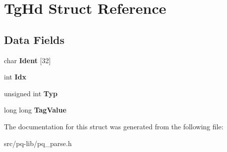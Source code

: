 \hypertarget{struct_tg_hd}{}\section{Tg\+Hd Struct Reference}
\label{struct_tg_hd}
\subsection*{Data Fields}
\begin{DoxyCompactItemize}
\item 
\hypertarget{struct_tg_hd_ab0c0523d5cf6f8f7e829c7cb9a71e26c}{}char {\bfseries Ident} \mbox{[}32\mbox{]}\label{struct_tg_hd_ab0c0523d5cf6f8f7e829c7cb9a71e26c}

\item 
\hypertarget{struct_tg_hd_a5c3a15f69644a6f40e92d622cd896c43}{}int {\bfseries Idx}\label{struct_tg_hd_a5c3a15f69644a6f40e92d622cd896c43}

\item 
\hypertarget{struct_tg_hd_ac9f557303814069bfdb07e797c01b274}{}unsigned int {\bfseries Typ}\label{struct_tg_hd_ac9f557303814069bfdb07e797c01b274}

\item 
\hypertarget{struct_tg_hd_abf24048c0f1fba937de64b82981ffe4c}{}long long {\bfseries Tag\+Value}\label{struct_tg_hd_abf24048c0f1fba937de64b82981ffe4c}

\end{DoxyCompactItemize}


The documentation for this struct was generated from the following file\+:\begin{DoxyCompactItemize}
\item 
src/pq-\/lib/pq\+\_\+parse.\+h\end{DoxyCompactItemize}
